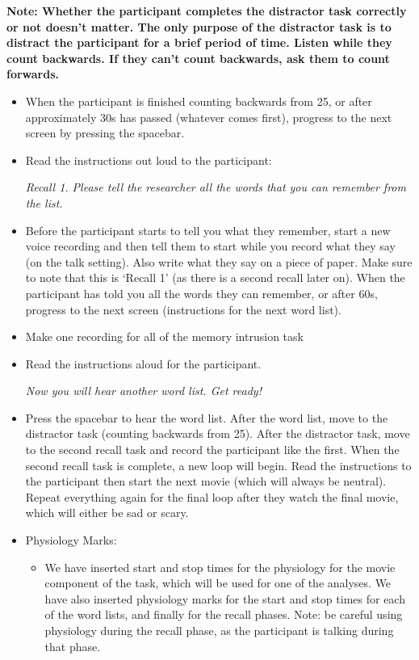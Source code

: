 \documentclass[]{book}
\providecommand{\tightlist}{%
  \setlength{\itemsep}{0pt}\setlength{\parskip}{0pt}}
\begin{document}
\textbf{Note: Whether the participant completes the distractor task correctly or not doesn't matter. The only purpose of the distractor task is to distract the participant for a brief period of time. Listen while they count backwards. If they can't count backwards, ask them to count forwards.}

\begin{itemize}
\item
  When the participant is finished counting backwards from 25, or after approximately 30s has passed (whatever comes first), progress to the next screen by pressing the spacebar.
\item
  Read the instructions out loud to the participant:

  \emph{Recall 1. Please tell the researcher all the words that you can remember from the list.}
\item
  Before the participant starts to tell you what they remember, start a new voice recording and then tell them to start while you record what they say (on the talk setting). Also write what they say on a piece of paper. Make sure to note that this is `Recall 1' (as there is a second recall later on). When the participant has told you all the words they can remember, or after 60s, progress to the next screen (instructions for the next word list).
\item
  Make one recording for all of the memory intrusion task
\item
  Read the instructions aloud for the participant.

  \emph{Now you will hear another word list. Get ready!}
\item
  Press the spacebar to hear the word list. After the word list, move to the distractor task (counting backwards from 25). After the distractor task, move to the second recall task and record the participant like the first. When the second recall task is complete, a new loop will begin. Read the instructions to the participant then start the next movie (which will always be neutral). Repeat everything again for the final loop after they watch the final movie, which will either be sad or scary.
\item
  Physiology Marks:

  \begin{itemize}
  \tightlist
  \item
    We have inserted start and stop times for the physiology for the movie component of the task, which will be used for one of the analyses. We have also inserted physiology marks for the start and stop times for each of the word lists, and finally for the recall phases. Note: be careful using physiology during the recall phase, as the participant is talking during that phase.
  \end{itemize}
\end{itemize}
\end{document}
